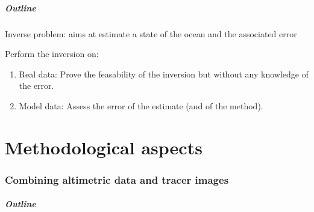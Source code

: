 \documentclass[compress,slidescentered,notes=show]{beamer}
\begin{document}
\begin{frame}
  \frametitle{Outline}

  \begin{block}{}
    Inverse problem: aims at estimate a state of the ocean and the associated error
  \end{block}

  \begin{block}{Perform the inversion on:}
  \begin{enumerate}
    \item Real data: Prove the feasability of the inversion but without any knowledge of the error.%
    \item Model data: Assess the error of the estimate (and of the method).
  \end{enumerate}
  \end{block}
\end{frame}

\part{Methodological aspects}
\section[Method]{Combining altimetric data and tracer images}
\begin{frame}
  \frametitle{Outline}
\end{frame}
\end{document}

